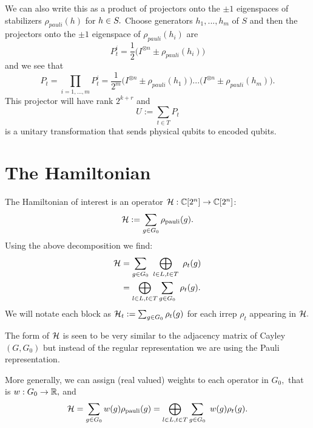 \documentclass[12pt]{article}
\begin{document}
We can also write this as a product of projectors onto
the $\pm 1$ eigenspaces of stabilizers $\rho_{pauli}(h)$ for $h\in S.$
Choose generators $h_1,...,h_m$ of $S$
and then the projectors onto the $\pm 1$ eigenspace of $\rho_{pauli}(h_i)$ are
$$
P^i_t = \frac{1}{2} \bigl(I^{\otimes n} \pm \rho_{pauli}(h_i) \bigr)
$$
and we see that 
$$
P_t = \prod_{i=1,...,m} P^i_t 
    = \frac{1}{2^m} \bigl(I^{\otimes n} \pm \rho_{pauli}(h_1)\bigr)
    ...\bigl(I^{\otimes n} \pm \rho_{pauli}(h_m)\bigr).
$$
This projector will have rank $2^{k+r}$ and
$$
U := \sum_{t\in T} P_t
$$
is a unitary transformation that sends
physical qubits to encoded qubits.


\section{The Hamiltonian}

The Hamiltonian of interest is 
an operator $\mathcal{H}:\mathbb{C}[2^n]\to\mathbb{C}[2^n]$:
$$ \mathcal{H} := \sum_{g\in G_0} \rho_{\mathrm{pauli}}(g).$$
Using the above decomposition we find:
\begin{align*}
    \mathcal{H} &= \sum_{g\in G_0}\ \bigoplus_{l\in L, t\in T}\ \rho_t(g)\\
         &= \bigoplus_{l\in L, t\in T} \sum_{g\in G_0}\ \rho_t(g).
\end{align*}
We will notate each block as
$\mathcal{H}_t := \sum_{g\in G_0}\rho_t(g)$
for each irrep $\rho_t$ appearing in $\mathcal{H}.$

The form of $\mathcal{H}$ is seen to be very similar
to the adjacency matrix of Cayley$(G, G_0)$ but
instead of the regular representation we are
using the Pauli representation.

More generally, we can assign (real valued) weights
to each operator in $G_0,$ that is
$w:G_0\to\mathbb{R},$
and 
\begin{align*}
    \mathcal{H} = \sum_{g\in G_0} w(g) \rho_{\mathrm{pauli}}(g)
            = \bigoplus_{l\in L, t\in T} \sum_{g\in G_0}\ w(g) \rho_t(g).
\end{align*}
\end{document}
